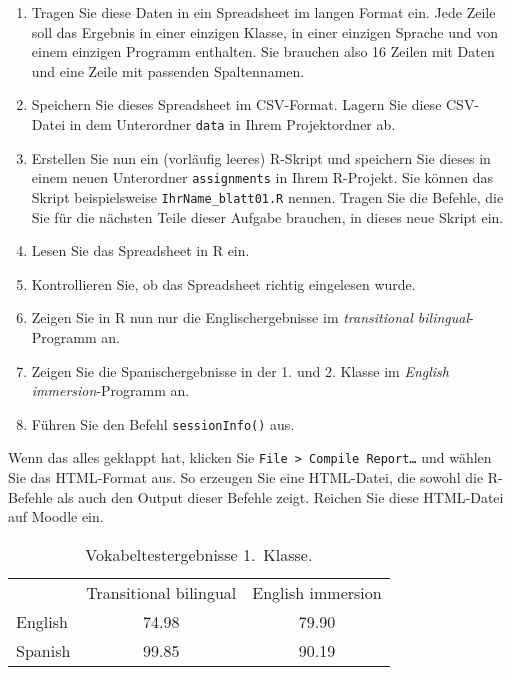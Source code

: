 \documentclass[10pt]{article}\usepackage[]{graphicx}\usepackage[]{xcolor}
\begin{document}
\begin{enumerate}
\item Tragen Sie diese Daten in ein Spread\-sheet im 
langen Format ein. Jede Zeile soll das Ergebnis in einer einzigen 
Klasse, in einer einzigen Sprache und von einem einzigen Programm 
enthalten. Sie brauchen also 16 Zeilen mit Daten und eine Zeile 
mit passenden Spaltennamen.

\item Speichern Sie dieses Spread\-sheet im CSV-Format.
Lagern Sie diese CSV-Datei in dem Unterordner
\texttt{data} in Ihrem Projektordner ab.

\item Erstellen Sie nun ein (vorläufig leeres) R-Skript und speichern 
Sie dieses in einem neuen Unterordner \texttt{assignments} in Ihrem R-Projekt.
Sie können das Skript beispielsweise \texttt{IhrName\_blatt01.R} nennen.
Tragen Sie die Befehle, die Sie für die nächsten Teile dieser
Aufgabe brauchen, in dieses neue Skript ein.

\item Lesen Sie das Spread\-sheet in R ein.

\item Kontrollieren Sie, ob das Spread\-sheet richtig eingelesen wurde.

\item Zeigen Sie in R nun nur die Englischergebnisse im \textit{transitional bilingual}-Programm an.

\item Zeigen Sie die Spanischergebnisse in der 1. und 2. Klasse im \textit{English immersion}-Programm an.

\item Führen Sie den Befehl \texttt{sessionInfo()} aus.
\end{enumerate}

Wenn das alles geklappt hat, klicken Sie \texttt{File > Compile Report\dots} und wählen Sie
das HTML-Format aus. So erzeugen Sie eine HTML-Datei, die sowohl die R-Befehle
als auch den Output dieser Befehle zeigt. Reichen Sie diese HTML-Datei auf Moodle ein.

\begin{table}[h]
\centering
\caption{Vokabeltestergebnisse 1.\ Klasse.}
\label{tab:slavin_1}
\begin{tabular}{@{}lcc@{}}
            & Transitional bilingual  & English immersion \\
 English    & 74.98                   & 79.90 \\
 Spanish    & 99.85                   & 90.19
\end{tabular}
\end{table}
\end{document}
